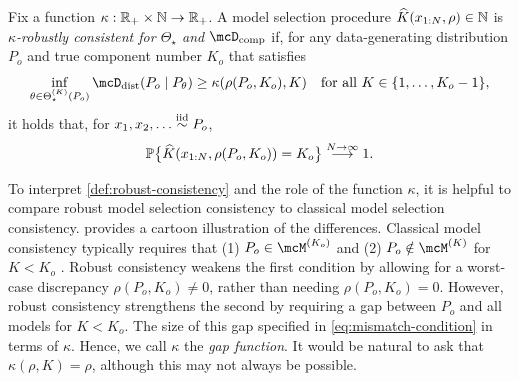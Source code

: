 \begin{definition} \label{def:robust-consistency}
	Fix a function $\kappa : \mathbb{R}_{+} \times \mathbb{N} \to \mathbb{R}_{+}$. 
	A model selection procedure $\widehat K(x_{1:N}, \rho) \in \mathbb{N}$ is \emph{$\kappa$-robustly consistent for $\Theta_{\star}$ and $\compDisc$} if,
	for any data-generating distribution $P_o$ and true component number $K_o$ that satisfies 
	\[ \label{eq:mismatch-condition}
		\inf_{\theta \in \Theta_{\star}^{(K)}(P_{o})} \distDisc(P_{o} \mid P_{\theta}) \ge \kappa(\rho(P_{o}, K_{o}), K)
		\quad\text{for all $K \in \{1,\dots,K_{o}-1\}$},
	\]
	it holds that, for $x_{1}, x_{2}, \dots \stackrel{\text{iid}}{\sim} P_{o}$, 
	\[
		\mathbb{P}\big\{\widehat K(x_{1:N}, \rho(P_{o}, K_{o})) = K_o \big\} \overset{N \to \infty}{\longrightarrow} 1.
	\]
\end{definition}
To interpret \cref{def:robust-consistency} and the role of the function $\kappa$, 
it is helpful to compare robust model selection consistency to classical model selection consistency.
 provides a cartoon illustration of the differences. 
Classical model consistency typically requires that  
(1) $P_o \in \model{K_o}$ and (2) $P_{o} \notin \model{K}$ for $K < K_o$ .
Robust consistency weakens the first condition by allowing for a worst-case discrepancy $\rho(P_{o}, K_{o}) \ne 0$,
rather than needing $\rho(P_{o}, K_{o}) = 0$.
However, robust consistency strengthens the second by requiring a gap between $P_o$ 
and all models for $K < K_o$.
The size of this gap specified in \cref{eq:mismatch-condition} in terms of $\kappa$. 
Hence, we call $\kappa$ the \emph{gap function}. 
It would be natural to ask that $\kappa(\rho, K) = \rho$, although this may not always be possible. 

